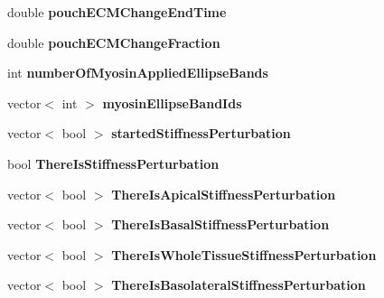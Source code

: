 \begin{DoxyCompactItemize}
\item 
\hypertarget{classSimulation_abbb40a5902677375bd7d4f30336accb1}{}double {\bfseries pouch\+E\+C\+M\+Change\+End\+Time}\label{classSimulation_abbb40a5902677375bd7d4f30336accb1}

\item 
\hypertarget{classSimulation_a7767563df2d0e9f4d9191dbb6742a6ca}{}double {\bfseries pouch\+E\+C\+M\+Change\+Fraction}\label{classSimulation_a7767563df2d0e9f4d9191dbb6742a6ca}

\item 
\hypertarget{classSimulation_ab874f20a1b418affb7091c8965f073cc}{}int {\bfseries number\+Of\+Myosin\+Applied\+Ellipse\+Bands}\label{classSimulation_ab874f20a1b418affb7091c8965f073cc}

\item 
\hypertarget{classSimulation_af3faf7b75b8442f6c6eafcaf8e5c1a61}{}vector$<$ int $>$ {\bfseries myosin\+Ellipse\+Band\+Ids}\label{classSimulation_af3faf7b75b8442f6c6eafcaf8e5c1a61}

\item 
\hypertarget{classSimulation_a1bca71119ebb725242046d637ca726f6}{}vector$<$ bool $>$ {\bfseries started\+Stiffness\+Perturbation}\label{classSimulation_a1bca71119ebb725242046d637ca726f6}

\item 
\hypertarget{classSimulation_afe8a88fffd9016ee11e7e2575109d437}{}bool {\bfseries There\+Is\+Stiffness\+Perturbation}\label{classSimulation_afe8a88fffd9016ee11e7e2575109d437}

\item 
\hypertarget{classSimulation_a38e07666edb404d7c45e8668e6c0bd50}{}vector$<$ bool $>$ {\bfseries There\+Is\+Apical\+Stiffness\+Perturbation}\label{classSimulation_a38e07666edb404d7c45e8668e6c0bd50}

\item 
\hypertarget{classSimulation_a73944cd131056c2766b2719fb1bbc10b}{}vector$<$ bool $>$ {\bfseries There\+Is\+Basal\+Stiffness\+Perturbation}\label{classSimulation_a73944cd131056c2766b2719fb1bbc10b}

\item 
\hypertarget{classSimulation_a6007819003e8ced9f58a79908b45b2ce}{}vector$<$ bool $>$ {\bfseries There\+Is\+Whole\+Tissue\+Stiffness\+Perturbation}\label{classSimulation_a6007819003e8ced9f58a79908b45b2ce}

\item 
\hypertarget{classSimulation_a5d73b458acc7beb3ac2d05472ed8bc82}{}vector$<$ bool $>$ {\bfseries There\+Is\+Basolateral\+Stiffness\+Perturbation}\label{classSimulation_a5d73b458acc7beb3ac2d05472ed8bc82}


\end{DoxyCompactItemize}
